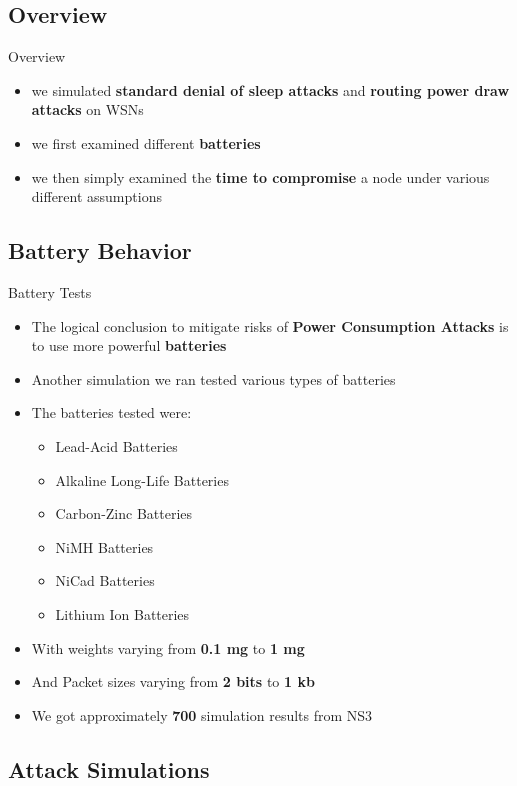 \documentclass{beamer}
\begin{document}
\subsection{Overview}
\begin{frame}{Overview}
\begin{itemize}
	\item we simulated \textbf{standard denial of sleep attacks} and \textbf{routing power draw attacks} on WSNs
	\item we first examined different \textbf{batteries}
	\item we then simply examined the \textbf{time to compromise} a node under various different assumptions
\end{itemize}
\end{frame}
\subsection{Battery Behavior}

\begin{frame}{Battery Tests}
\begin{itemize}
	\item The logical conclusion to mitigate risks of \textbf{Power Consumption Attacks} is to use more powerful \textbf{batteries}
	\item Another simulation we ran tested various types of batteries
	\item The batteries tested were: 
	\begin{itemize}
	  \item Lead-Acid Batteries
	  \item Alkaline Long-Life Batteries
	  \item Carbon-Zinc Batteries
	  \item NiMH Batteries
	  \item NiCad Batteries
	  \item Lithium Ion Batteries
	\end{itemize}
	\item With weights varying from \textbf{0.1 mg} to \textbf{1 mg}
	\item And Packet sizes varying from \textbf{2 bits} to \textbf{1 kb}
	\item We got approximately \textbf{700} simulation results from NS3
\end{itemize}
\end{frame}

\subsection{Attack Simulations}
\end{document}

